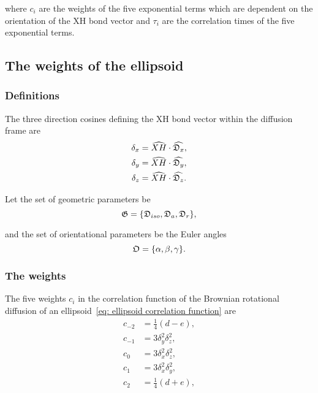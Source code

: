 \noindent where $c_i$ are the weights of the five exponential terms which are dependent on the orientation of the XH bond vector and $\tau_i$ are the correlation times of the five exponential terms.




\subsection{The weights of the ellipsoid}


\subsubsection{Definitions}

The three direction cosines defining the XH bond vector within the diffusion frame are
\begin{subequations}
\begin{align}
    \delta_x &= \widehat{XH} \cdot \widehat{\mathfrak{D}_x}, \\
    \delta_y &= \widehat{XH} \cdot \widehat{\mathfrak{D}_y}, \\
    \delta_z &= \widehat{XH} \cdot \widehat{\mathfrak{D}_z}.
\end{align}
\end{subequations}

\noindent Let the set of geometric parameters be
\begin{equation}
    \mathfrak{G} = \{\mathfrak{D}_{iso}, \mathfrak{D}_a, \mathfrak{D}_r\},
\end{equation}

\noindent and the set of orientational parameters be the Euler angles
\begin{equation}
    \mathfrak{O} = \{\alpha, \beta, \gamma\}.
\end{equation}



\subsubsection{The weights}

The five weights $c_i$ in the correlation function of the Brownian rotational diffusion of an ellipsoid~\eqref{eq: ellipsoid correlation function} are
\begin{subequations}
\begin{align}
 c_{-2} &= \tfrac{1}{4}(d - e),     \\
 c_{-1} &= 3\delta_y^2\delta_z^2,   \\
 c_{0}  &= 3\delta_x^2\delta_z^2,   \\
 c_{1}  &= 3\delta_x^2\delta_y^2,   \\
 c_{2}  &= \tfrac{1}{4}(d + e),
\end{align}
\end{subequations}

